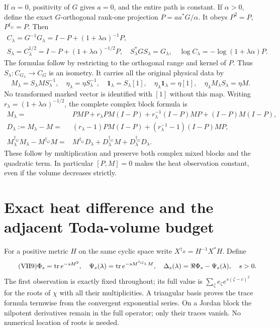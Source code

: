 \documentclass[11pt]{article}
\begin{document}
If \(\alpha=0\), positivity of \(G\) gives \(a=0\), and the entire
path is constant. If \(\alpha>0\), define the exact \(G\)-orthogonal
rank-one projection
\(P=aa^*G/\alpha\). It obeys \(P^2=P\), \(P^{\dagger_G}=P\).
Then
\begin{equation}\tag{VH6}\label{hvh:VH6}
\begin{gathered}
C_\lambda=G^{-1}G_\lambda=I-P+(1+\lambda\alpha)^{-1}P,\\
S_\lambda=C_\lambda^{1/2}=I-P+(1+\lambda\alpha)^{-1/2}P,\quad
S_\lambda^*GS_\lambda=G_\lambda,\quad
\log C_\lambda=-\log(1+\lambda\alpha)P.
\end{gathered}
\end{equation}
The formulas follow by restricting to the orthogonal range and kernel
of \(P\). Thus \(S_\lambda:C_{G_\lambda}\to C_G\) is an isometry.
It carries all the original physical data by
\begin{equation}\tag{VH7}\label{hvh:VH7}
M_\lambda=S_\lambda MS_\lambda^{-1},\quad
\eta_\lambda=\eta S_\lambda^{-1},\quad
\mathbf1_\lambda=S_\lambda[1],\quad
\eta_\lambda\mathbf1_\lambda=\eta[1],\quad
\eta_\lambda M_\lambda S_\lambda=\eta M.
\end{equation}
No transformed marked vector is identified with \([1]\) without this
map. Writing \(r_\lambda=(1+\lambda\alpha)^{-1/2}\), the complete
complex block formula is
\begin{equation}\tag{VH8}\label{hvh:VH8}
\begin{split}
M_\lambda={}&PMP+r_\lambda PM(I-P)
+r_\lambda^{-1}(I-P)MP+(I-P)M(I-P),\\
D_\lambda:=M_\lambda-M={}&(r_\lambda-1)PM(I-P)
+(r_\lambda^{-1}-1)(I-P)MP,\\
M_\lambda^{\dagger_G}M_\lambda-M^{\dagger_G}M
={}&M^{\dagger_G}D_\lambda+D_\lambda^{\dagger_G}M
+D_\lambda^{\dagger_G}D_\lambda.
\end{split}
\end{equation}
These follow by multiplication and preserve both complex mixed blocks
and the quadratic term. In particular \([P,M]=0\) makes the heat
observation constant, even if the volume decreases strictly.

\section{Exact heat difference and the adjacent Toda-volume budget}

For a positive metric \(H\) on the same cyclic space write
\(X^{\dagger_H}=H^{-1}X^*H\). Define
\begin{equation}\tag{VH9}\label{hvh:VH9}
\Phi_s=\operatorname{tr} e^{-sM^2},\quad
\Psi_s(\lambda)=\operatorname{tr} e^{-sM^{\dagger_{G_\lambda}}M},\quad
\Delta_s(\lambda)=\Re\Phi_s-\Psi_s(\lambda),\quad s>0.
\end{equation}
The first observation is exactly fixed throughout; its full value is
\(\sum_\zeta e_\zeta e^{s(\zeta-c)^2}\) for the roots of \(\chi\)
with all their multiplicities. A triangular basis proves the trace
formula termwise from the convergent exponential series. On a Jordan
block the nilpotent derivatives remain in the full operator; only
their traces vanish. No numerical location of roots is needed.
\end{document}
